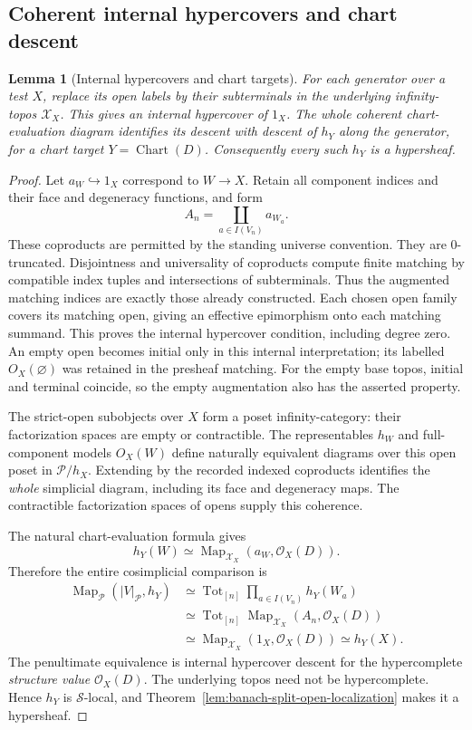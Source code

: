 \documentclass[12pt]{amsart}
\newtheorem{lem}[thm]{Lemma}
\theoremstyle{definition}
\theoremstyle{remark}
\numberwithin{equation}{section}
\DeclareMathOperator{\Map}{Map}
\DeclareMathOperator{\Tot}{Tot}
\begin{document}
\subsection{Coherent internal hypercovers and chart descent}

\begin{lem}[Internal hypercovers and chart targets]
For each generator over a test $X$, replace its
open labels by their subterminals in the underlying
infinity-topos $\mathcal X_X$.
\label{lem:banach-internal-open-hypercover}
This gives an internal hypercover of $1_X$.
The whole coherent chart-evaluation diagram
identifies its descent with descent of $h_Y$
along the generator, for a chart target
$Y=\operatorname{Chart}(D)$.
Consequently every such $h_Y$ is a hypersheaf.
\end{lem}

\begin{proof}
Let $a_W\hookrightarrow1_X$ correspond to $W\to X$.
Retain all component indices and their face and
degeneracy functions, and form
\[
 A_n=\coprod_{a\in I(V_n)}a_{W_a}.
\]
These coproducts are permitted by the standing
universe convention. They are $0$-truncated.
Disjointness and universality of coproducts
compute finite matching by compatible index
tuples and intersections of subterminals.
Thus the augmented matching indices are exactly
those already constructed. Each chosen open
family covers its matching open, giving an
effective epimorphism onto each matching summand.
This proves the internal hypercover condition,
including degree zero. An empty open becomes
initial only in this internal interpretation;
its labelled $O_X(\varnothing)$ was retained
in the presheaf matching. For the empty base
topos, initial and terminal coincide, so the
empty augmentation also has the asserted property.

The strict-open subobjects over $X$ form a poset
infinity-category: their factorization spaces
are empty or contractible. The representables
$h_W$ and full-component models $O_X(W)$ define
naturally equivalent diagrams over this open
poset in $\mathcal P/h_X$. Extending by the
recorded indexed coproducts identifies the
\emph{whole} simplicial diagram, including its
face and degeneracy maps. The contractible
factorization spaces of opens supply this coherence.

The natural chart-evaluation formula gives
\[
 h_Y(W)\simeq
 \Map_{\mathcal X_X}(a_W,\mathcal O_X(D)).
\]
Therefore the entire cosimplicial comparison is
\[
\begin{split}
 \Map_{\mathcal P}(|V|_{\mathcal P},h_Y)
 &\simeq \Tot_{[n]}
       \prod_{a\in I(V_n)}h_Y(W_a)\\
 &\simeq \Tot_{[n]}
       \Map_{\mathcal X_X}(A_n,\mathcal O_X(D))\\
 &\simeq \Map_{\mathcal X_X}(1_X,\mathcal O_X(D))
 \simeq h_Y(X).
\end{split}
\]
The penultimate equivalence is internal hypercover
descent for the hypercomplete \emph{structure value}
$\mathcal O_X(D)$. The underlying topos need not
be hypercomplete. Hence $h_Y$ is $\mathscr S$-local,
and Theorem~\ref{lem:banach-split-open-localization}
makes it a hypersheaf.
\end{proof}
\end{document}

